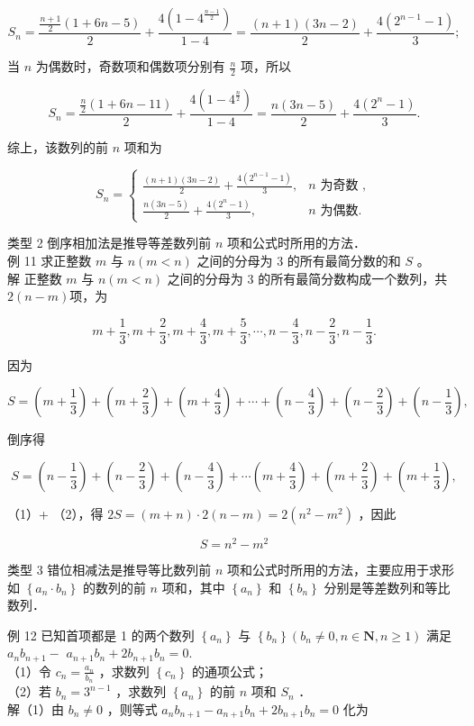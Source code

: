 \documentclass[10pt]{article}
\begin{document}
\[
S_{n}=\frac{\frac{n+1}{2}(1+6 n-5)}{2}+\frac{4\left(1-4^{\frac{n-1}{2}}\right)}{1-4}=\frac{(n+1)(3 n-2)}{2}+\frac{4\left(2^{n-1}-1\right)}{3} ;
\]

当 \(n\) 为偶数时，奇数项和偶数项分别有 \(\frac{n}{2}\) 项，所以

\[
S_{n}=\frac{\frac{n}{2}(1+6 n-11)}{2}+\frac{4\left(1-4^{\frac{n}{2}}\right)}{1-4}=\frac{n(3 n-5)}{2}+\frac{4\left(2^{n}-1\right)}{3} .
\]

综上，该数列的前 \(n\) 项和为

\[
S_{n}= \begin{cases}\frac{(n+1)(3 n-2)}{2}+\frac{4\left(2^{n-1}-1\right)}{3}, & n \text { 为奇数 }, \\ \frac{n(3 n-5)}{2}+\frac{4\left(2^{n}-1\right)}{3}, & n \text { 为偶数. }\end{cases}
\]

类型 2 倒序相加法是推导等差数列前 \(n\) 项和公式时所用的方法．\\
例 11 求正整数 \(m\) 与 \(n(m<n)\) 之间的分母为 3 的所有最简分数的和 \(S\) 。\\
解 正整数 \(m\) 与 \(n(m<n)\) 之间的分母为 3 的所有最简分数构成一个数列，共 \(2(n-m)\)项，为

\[
m+\frac{1}{3}, m+\frac{2}{3}, m+\frac{4}{3}, m+\frac{5}{3}, \cdots, n-\frac{4}{3}, n-\frac{2}{3}, n-\frac{1}{3} .
\]

因为

\[
S=\left(m+\frac{1}{3}\right)+\left(m+\frac{2}{3}\right)+\left(m+\frac{4}{3}\right)+\cdots+\left(n-\frac{4}{3}\right)+\left(n-\frac{2}{3}\right)+\left(n-\frac{1}{3}\right),
\]

倒序得

\[
S=\left(n-\frac{1}{3}\right)+\left(n-\frac{2}{3}\right)+\left(n-\frac{4}{3}\right)+\cdots\left(m+\frac{4}{3}\right)+\left(m+\frac{2}{3}\right)+\left(m+\frac{1}{3}\right),
\]

（1）+ （2），得 \(2 S=(m+n) \cdot 2(n-m)=2\left(n^{2}-m^{2}\right)\) ，因此

\[
S=n^{2}-m^{2}
\]

类型 3 错位相减法是推导等比数列前 \(n\) 项和公式时所用的方法，主要应用于求形如 \(\left\{a_{n} \cdot b_{n}\right\}\) 的数列的前 \(n\) 项和，其中 \(\left\{a_{n}\right\}\) 和 \(\left\{b_{n}\right\}\) 分别是等差数列和等比数列．

例 12 已知首项都是 1 的两个数列 \(\left\{a_{n}\right\}\) 与 \(\left\{b_{n}\right\}\left(b_{n} \neq 0, n \in \mathbf{N}, n \geqslant 1\right)\) 满足 \(a_{n} b_{n+1}-\) \(a_{n+1} b_{n}+2 b_{n+1} b_{n}=0\).\\
（1）令 \(c_{n}=\frac{a_{n}}{b_{n}}\) ，求数列 \(\left\{c_{n}\right\}\) 的通项公式；\\
（2）若 \(b_{n}=3^{n-1}\) ，求数列 \(\left\{a_{n}\right\}\) 的前 \(n\) 项和 \(S_{n}\) ．\\
解（1）由 \(b_{n} \neq 0\) ，则等式 \(a_{n} b_{n+1}-a_{n+1} b_{n}+2 b_{n+1} b_{n}=0\) 化为
\end{document}
